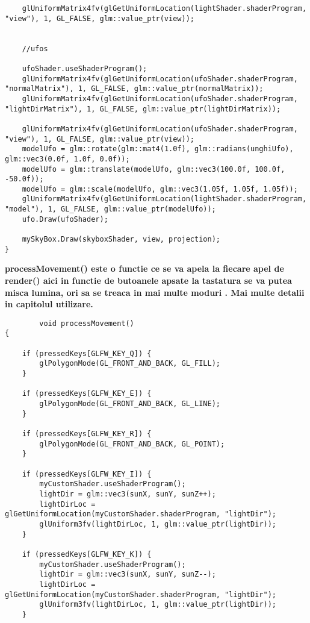 \begin{itemize}
\begin{verbatim}
	glUniformMatrix4fv(glGetUniformLocation(lightShader.shaderProgram, "view"), 1, GL_FALSE, glm::value_ptr(view));


	//ufos

	ufoShader.useShaderProgram();
	glUniformMatrix4fv(glGetUniformLocation(ufoShader.shaderProgram, "normalMatrix"), 1, GL_FALSE, glm::value_ptr(normalMatrix));
	glUniformMatrix4fv(glGetUniformLocation(ufoShader.shaderProgram, "lightDirMatrix"), 1, GL_FALSE, glm::value_ptr(lightDirMatrix));

	glUniformMatrix4fv(glGetUniformLocation(ufoShader.shaderProgram, "view"), 1, GL_FALSE, glm::value_ptr(view));
	modelUfo = glm::rotate(glm::mat4(1.0f), glm::radians(unghiUfo), glm::vec3(0.0f, 1.0f, 0.0f));
	modelUfo = glm::translate(modelUfo, glm::vec3(100.0f, 100.0f, -50.0f));
	modelUfo = glm::scale(modelUfo, glm::vec3(1.05f, 1.05f, 1.05f));
	glUniformMatrix4fv(glGetUniformLocation(lightShader.shaderProgram, "model"), 1, GL_FALSE, glm::value_ptr(modelUfo));
	ufo.Draw(ufoShader);

	mySkyBox.Draw(skyboxShader, view, projection);
}
	\end{verbatim}
	
	\tab \tab \bf{processMovement()} este o functie ce se va apela la fiecare apel de render() aici in functie de butoanele apsate la tastatura se va putea misca lumina, ori sa se treaca in mai multe moduri . Mai multe detalii in capitolul utilizare.\\
	
	\begin{verbatim}
		void processMovement()
{

	if (pressedKeys[GLFW_KEY_Q]) {
		glPolygonMode(GL_FRONT_AND_BACK, GL_FILL);
	}

	if (pressedKeys[GLFW_KEY_E]) {
		glPolygonMode(GL_FRONT_AND_BACK, GL_LINE);
	}

	if (pressedKeys[GLFW_KEY_R]) {
		glPolygonMode(GL_FRONT_AND_BACK, GL_POINT);
	}

	if (pressedKeys[GLFW_KEY_I]) {
		myCustomShader.useShaderProgram();
		lightDir = glm::vec3(sunX, sunY, sunZ++);
		lightDirLoc = glGetUniformLocation(myCustomShader.shaderProgram, "lightDir");
		glUniform3fv(lightDirLoc, 1, glm::value_ptr(lightDir));
	}

	if (pressedKeys[GLFW_KEY_K]) {
		myCustomShader.useShaderProgram();
		lightDir = glm::vec3(sunX, sunY, sunZ--);
		lightDirLoc = glGetUniformLocation(myCustomShader.shaderProgram, "lightDir");
		glUniform3fv(lightDirLoc, 1, glm::value_ptr(lightDir));
	}


\end{verbatim}
\end{itemize}
